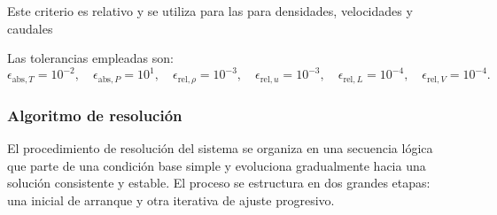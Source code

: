 Este criterio es relativo y se utiliza para las para densidades, velocidades y caudales

Las tolerancias empleadas son:
$$
      \epsilon_{\mathrm{abs},T} = 10^{-2},\quad
      \epsilon_{\mathrm{abs},P} = 10^{1},\quad
      \epsilon_{\mathrm{rel},\rho} = 10^{-3},\quad
      \epsilon_{\mathrm{rel},u} = 10^{-3},\quad
      \epsilon_{\mathrm{rel},L} = 10^{-4},\quad
      \epsilon_{\mathrm{rel},V} = 10^{-4}.
$$

\subsubsection{Algoritmo de resolución}
El procedimiento de resolución del sistema se organiza en una secuencia lógica que parte de una condición base simple y evoluciona gradualmente hacia una solución consistente y estable. El proceso se estructura en dos grandes etapas: una inicial de arranque y otra iterativa de ajuste progresivo.

